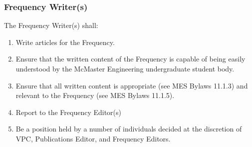 \subsubsection{Frequency Writer(s)}
\label{frequency-writers} 
The Frequency Writer(s) shall: 

\begin{enumerate} 
  \item     
   Write articles for the Frequency. 
  \item    
   Ensure that the written content of the Frequency is capable of being easily understood by the McMaster Engineering undergraduate student body. 
  \item    
   Ensure that all written content is appropriate (see MES Bylaws 11.1.3) and relevant to the Frequency (see MES Bylaws 11.1.5). 
  \item    
   Report to the Frequency Editor(s) 
  \item    
   Be a position held by a number of individuals decided at the discretion of VPC, Publications Editor, and Frequency Editors. 
\end{enumerate} 